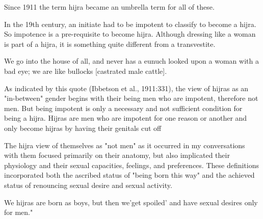 Since 1911 the term hijra became an umbrella term for all of these.

In the 19th century, an initiate had to be impotent to classify to become a hijra. 
So impotence is a pre-requisite to become hijra.
Although dressing like a woman is part of a hijra, it is something quite different from a transvestite.

We go into the house of all, and never has a eunuch looked upon a woman with a bad eye; we are like bullocks [castrated male cattle].

As indicated by this quote (Ibbetson et al., 1911:331), the view of hijras as an "in-between" gender begins with their being men who are impotent, therefore not men. But being impotent is
only a necessary and not sufficient condition for being a hijra. Hijras are men who are impotent for one reason or another and only become hijras by having their genitals cut off

The hijra view of themselves as "not men" as it occurred in my conversations with them focused primarily on their anatomy, but also implicated their physiology and their sexual capacities, feelings, and preferences. These definitions incorporated both the ascribed status of "being born this way" and the achieved status of renouncing sexual desire and sexual activity.

We hijras are born as boys, but then we'get spoiled' and have sexual desires only for men."